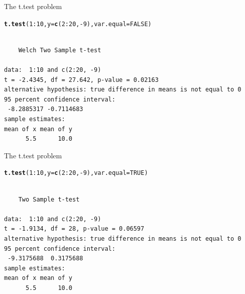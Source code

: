 \documentclass[10pt]{beamer}\usepackage[]{graphicx}\usepackage[]{color}
\makeatletter
\newcommand{\hlnum}[1]{\textcolor[rgb]{0.686,0.059,0.569}{#1}}%
\newcommand{\hlopt}[1]{\textcolor[rgb]{0,0,0}{#1}}%
\newcommand{\hlstd}[1]{\textcolor[rgb]{0.345,0.345,0.345}{#1}}%
\newcommand{\hlkwc}[1]{\textcolor[rgb]{0.333,0.667,0.333}{#1}}%
\newcommand{\hlkwd}[1]{\textcolor[rgb]{0.737,0.353,0.396}{\textbf{#1}}}%
\newenvironment{kframe}{%
 \def\at@end@of@kframe{}%
 \ifinner\ifhmode%
  \def\at@end@of@kframe{\end{minipage}}%
  \begin{minipage}{\columnwidth}%
 \fi\fi%
 \def\FrameCommand##1{\hskip\@totalleftmargin \hskip-\fboxsep
 \colorbox{shadecolor}{##1}\hskip-\fboxsep
     \hskip-\linewidth \hskip-\@totalleftmargin \hskip\columnwidth}%
 \MakeFramed {\advance\hsize-\width
   \@totalleftmargin\z@ \linewidth\hsize
   \@setminipage}}%
 {\par\unskip\endMakeFramed%
 \at@end@of@kframe}
\newenvironment{knitrout}{}{} %
\makeatother
\begin{document}
\begin{frame}[fragile]{The t.test problem}
  
\begin{knitrout}
\color{fgcolor}\begin{kframe}
\begin{alltt}
\hlkwd{t.test}\hlstd{(}\hlnum{1}\hlopt{:}\hlnum{10}\hlstd{,} \hlkwc{y} \hlstd{=} \hlkwd{c}\hlstd{(}\hlnum{2}\hlopt{:}\hlnum{20}\hlstd{,}\hlopt{-}\hlnum{9}\hlstd{),} \hlkwc{var.equal} \hlstd{=} \hlnum{FALSE}\hlstd{)}
\end{alltt}
\begin{verbatim}

	Welch Two Sample t-test

data:  1:10 and c(2:20, -9)
t = -2.4345, df = 27.642, p-value = 0.02163
alternative hypothesis: true difference in means is not equal to 0
95 percent confidence interval:
 -8.2885317 -0.7114683
sample estimates:
mean of x mean of y 
      5.5      10.0 
\end{verbatim}
\end{kframe}
\end{knitrout}
\end{frame}

\begin{frame}[fragile]{The t.test problem}
\begin{knitrout}
\color{fgcolor}\begin{kframe}
\begin{alltt}
\hlkwd{t.test}\hlstd{(}\hlnum{1}\hlopt{:}\hlnum{10}\hlstd{,} \hlkwc{y} \hlstd{=} \hlkwd{c}\hlstd{(}\hlnum{2}\hlopt{:}\hlnum{20}\hlstd{,}\hlopt{-}\hlnum{9}\hlstd{),} \hlkwc{var.equal} \hlstd{=} \hlnum{TRUE}\hlstd{)}
\end{alltt}
\begin{verbatim}

	Two Sample t-test

data:  1:10 and c(2:20, -9)
t = -1.9134, df = 28, p-value = 0.06597
alternative hypothesis: true difference in means is not equal to 0
95 percent confidence interval:
 -9.3175688  0.3175688
sample estimates:
mean of x mean of y 
      5.5      10.0 
\end{verbatim}
\end{kframe}
\end{knitrout}
 
\end{frame}
\end{document}
